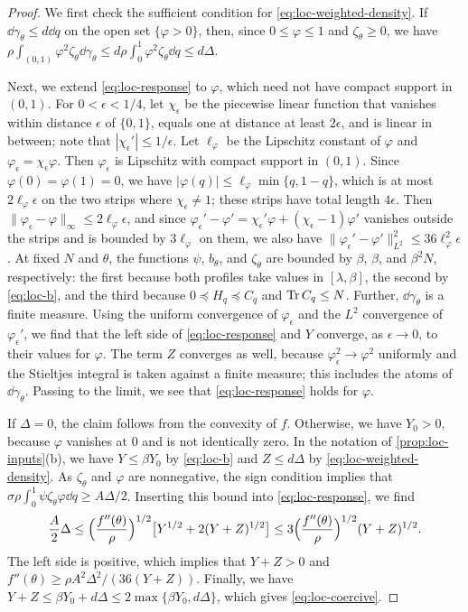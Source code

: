 \begin{proof}
We first check the sufficient condition for
\eqref{eq:loc-weighted-density}. If $\dd\gamma_\theta\le d\dd q$ on the open
set $\{\varphi>0\}$, then, since $0\le\varphi\le1$ and $\zeta_\theta\ge0$, we
have $\rho\int_{(0,1)}\varphi^2\zeta_\theta\dd\gamma_\theta\le
d\rho\int_0^1\varphi^2\zeta_\theta\dd q\le d\Delta$.

Next, we extend \eqref{eq:loc-response} to $\varphi$, which need not have
compact support in $(0,1)$. For $0<\epsilon<1/4$, let $\chi_\epsilon$ be the
piecewise linear function that vanishes within distance $\epsilon$ of
$\{0,1\}$, equals one at distance at least $2\epsilon$, and is linear in
between; note that $|\chi_\epsilon'|\le1/\epsilon$. Let $\ell_\varphi$ be the
Lipschitz constant of $\varphi$ and $\varphi_\epsilon=\chi_\epsilon\varphi$.
Then $\varphi_\epsilon$ is Lipschitz with compact support in $(0,1)$. Since
$\varphi(0)=\varphi(1)=0$, we have
$|\varphi(q)|\le\ell_\varphi\min\{q,1-q\}$, which is at most
$2\ell_\varphi\epsilon$ on the two strips where $\chi_\epsilon\ne1$; these
strips have total length $4\epsilon$. Then $\|\varphi_\epsilon-\varphi\|_\infty\le
2\ell_\varphi\epsilon$, and since
$\varphi_\epsilon'-\varphi'=\chi_\epsilon'\varphi+(\chi_\epsilon-1)\varphi'$
vanishes outside the strips and is bounded by $3\ell_\varphi$ on them, we also
have $\|\varphi_\epsilon'-\varphi'\|_{L^2}^2\le36\ell_\varphi^2\epsilon$. At
fixed $N$ and $\theta$, the functions $\psi$, $b_\theta$, and $\zeta_\theta$
are bounded by $\beta$, $\beta$, and $\beta^2N$, respectively: the first
because both profiles take values in $[\lambda,\beta]$, the second by
\eqref{eq:loc-b}, and the third because $0\preceq H_q\preceq C_q$ and
$\operatorname{Tr} C_q\le N$. Further,
$\dd\gamma_\theta$ is a finite measure. Using the uniform convergence of
$\varphi_\epsilon$ and the $L^2$ convergence of $\varphi_\epsilon'$, we find
that the left side of \eqref{eq:loc-response} and $Y$ converge, as
$\epsilon\to0$, to their values for $\varphi$. The term $Z$ converges as well, because
$\varphi_\epsilon^2\to\varphi^2$ uniformly and the Stieltjes integral is taken
against a finite measure; this includes the atoms of $\dd\gamma_\theta$.
Passing to the limit, we see that \eqref{eq:loc-response} holds for
$\varphi$.

If $\Delta=0$, the claim follows from the convexity of $f$. Otherwise, we have
$Y_0>0$, because $\varphi$ vanishes at $0$ and is not identically zero. In the
notation of \cref{prop:loc-inputs}(b), we have $Y\le\beta Y_0$ by
\eqref{eq:loc-b} and $Z\le d\Delta$ by \eqref{eq:loc-weighted-density}.
As $\zeta_\theta$ and $\varphi$ are nonnegative, the sign condition implies
that
$\sigma\rho\int_0^1\psi\zeta_\theta\varphi\dd q\ge A\Delta/2$. Inserting this
bound into \eqref{eq:loc-response}, we find
\[
 \frac A2\Delta\le\Bigl(\frac{f''(\theta)}\rho\Bigr)^{1/2}
 \bigl[Y^{1/2}+2(Y+Z)^{1/2}\bigr]
 \le3\Bigl(\frac{f''(\theta)}\rho\Bigr)^{1/2}(Y+Z)^{1/2}.
\]
The left side is positive, which implies that $Y+Z>0$ and
$f''(\theta)\ge\rho A^2\Delta^2/(36(Y+Z))$. Finally, we have
$Y+Z\le\beta Y_0+d\Delta\le2\max\{\beta Y_0,d\Delta\}$, which gives
\eqref{eq:loc-coercive}.
\end{proof}

